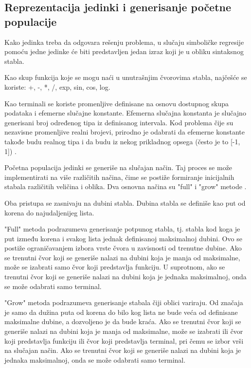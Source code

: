 \documentclass[main.tex]{subfiles}
\begin{document}
\subsection{Reprezentacija jedinki i generisanje početne populacije}
\label{sec:individual}

Kako jedinka treba da odgovara rešenju problema, u slučaju simboličke regresije pomoću jedne jedinke će biti predstavljen jedan izraz koji je u obliku sintaksnog stabla.

Kao skup funkcija koje se mogu naći u unutrašnjim čvorovima stabla, najčešće se koriste: {+, -, *, /, exp, sin, cos, log}. 

Kao terminali se koriste promenljive definisane na osnovu dostupnog skupa podataka i efemerne slučajne konstante. Efemerna slučajna konstanta je slučajno generisani broj određenog tipa iz definisanog intervala. Kod problema čije su nezavisne promenljive realni brojevi, prirodno je odabrati da efemerne konstante takođe budu realnog tipa i da budu iz nekog prikladnog opsega (često je to [-1, 1]) \cite{koza}.

Početna populacija jedinki se generiše na slučajan način. Taj proces se može implementirati na više različitih načina, čime se postiže formiranje inicijalnih stabala različitih veličina i oblika. Dva osnovna načina su "full" i "grow" metode \cite{koza}.  

Oba pristupa se zasnivaju na dubini stabla. Dubina stabla se definiše kao put od korena do najudaljenijeg lista.

"Full" metoda podrazumeva generisanje potpunog stabla, tj. stabla kod koga je put između korena i svakog lista jednak definisanoj maksimalnoj dubini. Ovo se postiže ograničavanjem izbora vrste čvora u zavisnosti od trenutne dubine. Ako se trenutni čvor koji se generiše nalazi na dubini koja je manja od maksimalne, može se izabrati samo čvor koji predstavlja funkciju. U suprotnom, ako se trenutni čvor koji se generiše nalazi na dubini koja je jednaka maksimalnoj, onda se može odabrati samo terminal.

"Grow" metoda podrazumeva generisanje stabala čiji oblici variraju. Od značaja je samo da dužina puta od korena do bilo kog lista ne bude veća od definisane maksimalne dubine, a dozvoljeno je da bude kraća. Ako se trenutni čvor koji se generiše nalazi na dubini koja je manja od maksimalne, može se izabrati ili čvor koji predstavlja funkciju ili čvor koji predstavlja terminal, pri čemu se izbor vrši na slučajan način. Ako se trenutni čvor koji se generiše nalazi na dubini koja je jednaka maksimalnoj, onda se može odabrati samo terminal. 
\end{document}
